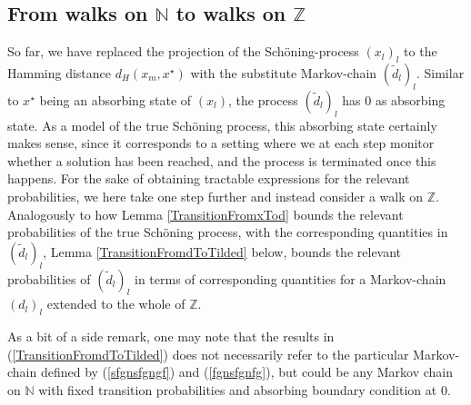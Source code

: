 \documentclass[a4paper,aps,floatfix]{revtex4}
\begin{document}
\subsection{From walks  on $\mathbb{N}$ to  walks  on $\mathbb{Z}$}
So far, we have replaced the projection of the Sch\"oning-process $(x_l)_l$ to the Hamming distance $d_H(x_m,x^{\star})$  with the substitute Markov-chain $(\tilde{d}_l)_l$. Similar to $x^{\star}$ being an absorbing state of $(x_l)$, the process $(\tilde{d}_l)_l$ has $0$ as absorbing state. As a model of the true Sch\"oning process, this  absorbing state certainly makes sense, since it  corresponds to a setting where we at each step monitor whether a solution has been reached, and the process is terminated once this happens.  For  the sake of obtaining tractable expressions for the relevant probabilities, we  here take one step further and instead consider a walk on $\mathbb{Z}$.  Analogously to how Lemma \ref{TransitionFromxTod} bounds the relevant probabilities of the true Sch\"oning process, with the corresponding quantities in $(\tilde{d}_l)_l$, Lemma \ref{TransitionFromdToTilded} below, bounds the relevant probabilities of $(\tilde{d}_l)_l$ in terms of corresponding quantities for a Markov-chain $(d_l)_l$ extended to the whole of $\mathbb{Z}$.

As a bit of a side remark, one may note that the results in (\ref{TransitionFromdToTilded}) does not necessarily refer to the particular Markov-chain defined by  (\ref{sfgnsfgngf}) and (\ref{fgnsfgnfg}), but could be any Markov chain on $\mathbb{N}$ with fixed transition probabilities and absorbing boundary condition at $0$. 
 
\end{document}
